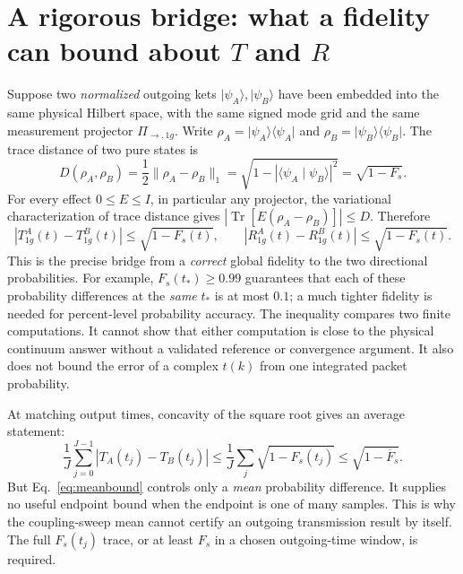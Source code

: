 \documentclass[11pt,a4paper]{article}
\newcommand{\ket}[1]{\lvert #1\rangle}
\newcommand{\bra}[1]{\langle #1\rvert}
\newcommand{\braket}[2]{\langle #1\mid #2\rangle}
\newcommand{\Tr}{\operatorname{Tr}}
\begin{document}
\section[A rigorous bridge: what a fidelity can bound about T and R]{A rigorous bridge: what a fidelity can bound about $T$ and $R$}
\label{sec:bounds}
Suppose two \emph{normalized} outgoing kets $\ket{\psi_A},\ket{\psi_B}$ have been embedded into the same physical Hilbert space, with the same signed mode grid and the same measurement projector $\Pi_{\to,1g}$. Write $\rho_A=\ket{\psi_A}\bra{\psi_A}$ and $\rho_B=\ket{\psi_B}\bra{\psi_B}$. The trace distance of two pure states is
\begin{equation}
 D(\rho_A,\rho_B)=\frac12\|\rho_A-\rho_B\|_1
 =\sqrt{1-|\braket{\psi_A}{\psi_B}|^2}
 =\sqrt{1-F_s}.
 \label{eq:tracedistance}
\end{equation}
For every effect $0\le E\le I$, in particular any projector, the variational characterization of trace distance gives $|\Tr[E(\rho_A-\rho_B)]|\le D$. Therefore
\begin{equation}
 \boxed{|T_{1g}^{A}(t)-T_{1g}^{B}(t)|\le\sqrt{1-F_s(t)},\qquad
 |R_{1g}^{A}(t)-R_{1g}^{B}(t)|\le\sqrt{1-F_s(t)}.}
 \label{eq:TRbound}
\end{equation}
This is the precise bridge from a \emph{correct} global fidelity to the two directional probabilities. For example, $F_s(t_*)\ge0.99$ guarantees that each of these probability differences at the \emph{same} $t_*$ is at most $0.1$; a much tighter fidelity is needed for percent-level probability accuracy. The inequality compares two finite computations. It cannot show that either computation is close to the physical continuum answer without a validated reference or convergence argument. It also does not bound the error of a complex $t(k)$ from one integrated packet probability.

At matching output times, concavity of the square root gives an average statement:
\begin{equation}
 \frac1J\sum_{j=0}^{J-1}|T_A(t_j)-T_B(t_j)|
 \le\frac1J\sum_j\sqrt{1-F_s(t_j)}
 \le\sqrt{1-\overline F_s}.
 \label{eq:meanbound}
\end{equation}
But Eq.~\eqref{eq:meanbound} controls only a \emph{mean} probability difference. It supplies no useful endpoint bound when the endpoint is one of many samples. This is why the coupling-sweep mean cannot certify an outgoing transmission result by itself. The full $F_s(t_j)$ trace, or at least $F_s$ in a chosen outgoing-time window, is required.
\end{document}
